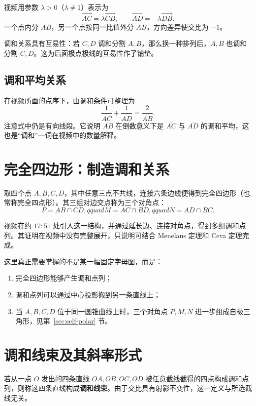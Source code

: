 \documentclass[UTF8,11pt]{ctexart}
\newcommand{\dirseg}[2]{\overline{#1#2}}
\begin{document}
视频用参数 $\lambda>0$（$\lambda\ne1$）表示为
\[
\overrightarrow{AC}=\lambda\overrightarrow{CB},
\qquad
\overrightarrow{AD}=-\lambda\overrightarrow{DB}.
\]
一个点内分 $AB$，另一个点按同一比值外分 $AB$，方向差异使交比为 $-1$。

调和关系具有互易性：若 $C,D$ 调和分割 $A,B$，那么换一种排列后，$A,B$ 也调和分割 $C,D$。这为后面极点极线的互易性作了铺垫。

\subsection{调和平均关系}

在视频所画的点序下，由调和条件可整理为
\begin{equation}
\label{eq:harmonic-mean}
\boxed{
\frac{1}{\dirseg AC}+\frac{1}{\dirseg AD}
=\frac{2}{\dirseg AB}
}.
\end{equation}
注意式中仍是有向线段。它说明 $\dirseg AB$ 在倒数意义下是 $\dirseg AC$ 与 $\dirseg AD$ 的调和平均，这也是“调和”一词在视频中的数量解释。

\section{完全四边形：制造调和关系}

取四个点 $A,B,C,D$，其中任意三点不共线，连接六条边线便得到完全四边形（也常称完全四点形）。其三组对边交点称为三个对角点：
\[
P=AB\cap CD,qquad
M=AC\cap BD,qquad
N=AD\cap BC.
\]

视频在约 $17{:}51$ 处引入这一结构，并通过延长边、连接对角点，得到多组调和点列。其证明在视频中没有完整展开，只说明可结合 Menelaus 定理和 Ceva 定理完成。

这里真正需要掌握的不是某一幅固定字母图，而是：
\begin{enumerate}
\item 完全四边形能够产生调和点列；
\item 调和点列可以通过中心投影搬到另一条直线上；
\item 当 $A,B,C,D$ 位于同一圆锥曲线上时，三个对角点 $P,M,N$ 进一步组成自极三角形，见第~\ref{sec:self-polar} 节。
\end{enumerate}

\section{调和线束及其斜率形式}

若从一点 $O$ 发出的四条直线 $OA,OB,OC,OD$ 被任意截线截得的四点构成调和点列，则称这四条直线构成\textbf{调和线束}。由于交比具有射影不变性，这一定义与所选截线无关。
\end{document}
